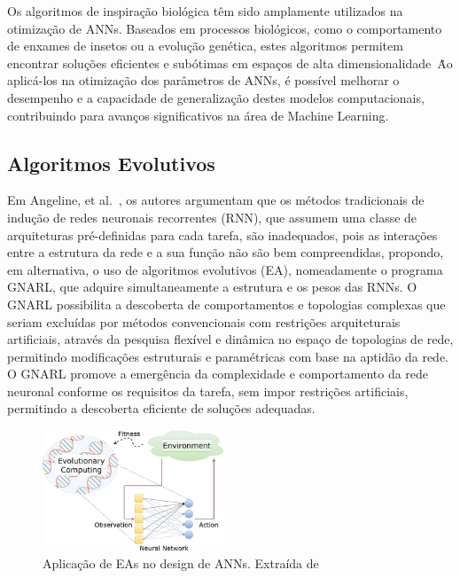 Os algoritmos de inspiração biológica têm sido amplamente utilizados na otimização de ANNs. Baseados em processos biológicos, como o comportamento de enxames de insetos ou a evolução genética, estes algoritmos permitem encontrar soluções eficientes e subótimas em espaços de alta dimensionalidade~\cite{Fister2013AOptimization}\.
Ao aplicá-los na otimização dos parâmetros de ANNs, é possível melhorar o desempenho e a capacidade de generalização destes modelos computacionais, contribuindo para avanços significativos na área de Machine Learning.

\subsection{Algoritmos Evolutivos}\label{subsec:algoritmos-evolutivos}

Em Angeline, et al.~\cite{Angeline1994AnNetworks}, os autores argumentam que os métodos tradicionais de indução de redes neuronais recorrentes (RNN), que assumem uma classe de arquiteturas pré-definidas para cada tarefa, são inadequados, pois as interações entre a estrutura da rede e a sua função não são bem compreendidas, propondo, em alternativa, o uso de algoritmos evolutivos (EA), nomeadamente o programa GNARL, que adquire simultaneamente a estrutura e os pesos das RNNs. O GNARL possibilita a descoberta de comportamentos e topologias complexas que seriam excluídas por métodos convencionais com restrições arquiteturais artificiais, através da pesquisa flexível e dinâmica no espaço de topologias de rede, permitindo modificações estruturais e paramétricas com base na aptidão da rede.
O GNARL promove a emergência da complexidade e comportamento da rede neuronal conforme os requisitos da tarefa, sem impor restrições artificiais, permitindo a descoberta eficiente de soluções adequadas.

\begin{figure}[htbp]
    \centering
    \includegraphics[width=0.48\textwidth]{imagens/evo_alg}
    \caption{Aplicação de EAs no design de ANNs. Extraída de~\cite{Darwish2020ALearning}}
    \label{fig:evo_alg}
\end{figure}

